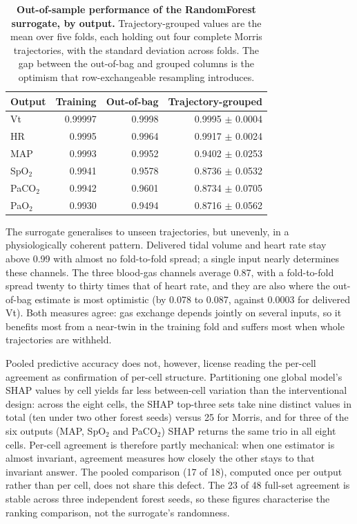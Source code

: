 \documentclass[pdflatex,sn-nature]{sn-jnl}%
\begin{document}
\begin{table}[htbp]
\centering
\caption{\textbf{Out-of-sample performance of the RandomForest surrogate, by output.} Trajectory-grouped values are the mean over five folds, each holding out four complete Morris trajectories, with the standard deviation across folds. The gap between the out-of-bag and grouped columns is the optimism that row-exchangeable resampling introduces.}
\label{tab:s13-oos}
\begin{tabular}{lrrr}
\toprule
Output & Training & Out-of-bag & Trajectory-grouped \\
\midrule
Vt & 0.99997 & 0.9998 & 0.9995 $\pm$ 0.0004 \\
HR & 0.9995 & 0.9964 & 0.9917 $\pm$ 0.0024 \\
MAP & 0.9993 & 0.9952 & 0.9402 $\pm$ 0.0253 \\
SpO$_2$ & 0.9941 & 0.9578 & 0.8736 $\pm$ 0.0532 \\
PaCO$_2$ & 0.9942 & 0.9601 & 0.8734 $\pm$ 0.0705 \\
PaO$_2$ & 0.9930 & 0.9494 & 0.8716 $\pm$ 0.0562 \\
\bottomrule
\end{tabular}
\end{table}

The surrogate generalises to unseen trajectories, but unevenly, in a physiologically coherent pattern. Delivered tidal volume and heart rate stay above 0.99 with almost no fold-to-fold spread; a single input nearly determines these channels. The three blood-gas channels average 0.87, with a fold-to-fold spread twenty to thirty times that of heart rate, and they are also where the out-of-bag estimate is most optimistic (by 0.078 to 0.087, against 0.0003 for delivered Vt). Both measures agree: gas exchange depends jointly on several inputs, so it benefits most from a near-twin in the training fold and suffers most when whole trajectories are withheld.

Pooled predictive accuracy does not, however, license reading the per-cell agreement as confirmation of per-cell structure. Partitioning one global model's SHAP values by cell yields far less between-cell variation than the interventional design: across the eight cells, the SHAP top-three sets take nine distinct values in total (ten under two other forest seeds) versus 25 for Morris, and for three of the six outputs (MAP, SpO$_2$ and PaCO$_2$) SHAP returns the same trio in all eight cells. Per-cell agreement is therefore partly mechanical: when one estimator is almost invariant, agreement measures how closely the other stays to that invariant answer. The pooled comparison (17 of 18), computed once per output rather than per cell, does not share this defect. The 23 of 48 full-set agreement is stable across three independent forest seeds, so these figures characterise the ranking comparison, not the surrogate's randomness.
\end{document}
